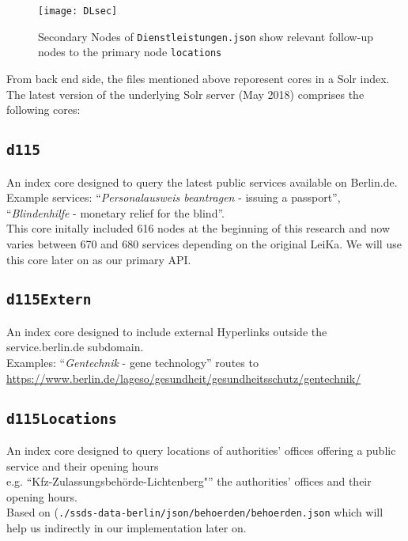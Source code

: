 \begin{figure}[H]
	\caption[Secondary Nodes of \texttt{Dienstleistungen.json} ]{Secondary Nodes of \texttt{Dienstleistungen.json} show relevant follow-up nodes to the primary node \texttt{locations}}
	\label{LeiKaJSON2}
	\texttt{[image: DLsec]}
\end{figure}







\begin{flushleft}


From back end side, the files mentioned above reporesent cores in a Solr index. The latest version of the underlying Solr server (May 2018) comprises the following cores:

	\subsection*{\texttt{d115}}
	 An index core designed to query the latest public services available on Berlin.de. \\ Example services: ``\textit{Personalausweis beantragen} - issuing a passport'', ``\textit{Blindenhilfe} - monetary relief for the blind''.\\  This core initally included 616 nodes at the beginning of this research and now varies between 670 and 680 services depending on the original LeiKa. We will use this core later on as our primary API.
	
\subsection*{\texttt{d115Extern}}
	An index core designed to include external Hyperlinks outside the service.berlin.de subdomain.\\
	Examples: ``\textit{Gentechnik} - gene technology'' routes to 
	\url{https://www.berlin.de/lageso/gesundheit/gesundheitsschutz/gentechnik/}
	
	\subsection*{\texttt{d115Locations}}
	An index core designed to query locations of authorities' offices offering a public service and their opening hours\\ %
	e.g. ``Kfz-Zulassungsbehörde-Lichtenberg"''
	the authorities' offices and their opening hours.\\
	Based on (\texttt{./ssds-data-berlin/json/behoerden/behoerden.json} which will help us indirectly in our implementation later on. 
	

\end{flushleft}
